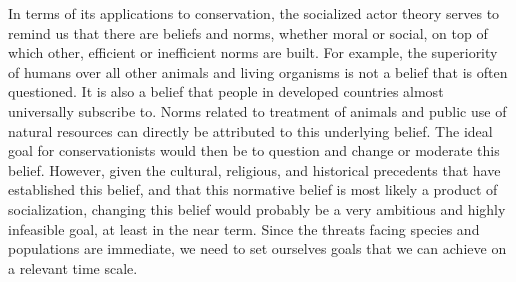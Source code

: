 \documentclass[rutwik_proposal.tex]{subfiles}
\begin{document}
In terms of its applications to conservation, the socialized actor theory serves to remind us that there are beliefs and norms, whether moral or social, on top of which other, efficient or inefficient norms are built. For example, the superiority of humans over all other animals and living organisms is not a belief that is often questioned. It is also a belief that people in developed countries almost universally subscribe to. Norms related to treatment of animals and public use of natural resources can directly be attributed to this underlying belief. The ideal goal for conservationists would then be to question and change or moderate this belief. However, given the cultural, religious, and historical precedents that have established this belief, and that this normative belief is most likely a product of socialization, changing this belief would probably be a very ambitious and highly infeasible goal, at least in the near term. Since the threats facing species and populations are immediate, we need to set ourselves goals that we can achieve on a relevant time scale.
\end{document}
